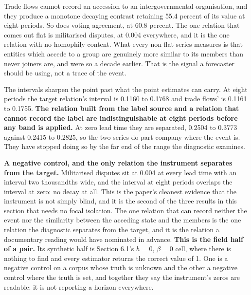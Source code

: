 \documentclass[twoside,11pt]{article}
\begin{document}
Trade flows cannot record an accession to an intergovernmental organisation, and they produce a monotone decaying contrast retaining 55.4 percent of its value at eight periods. So does voting agreement, at 60.8 percent. The one relation that comes out flat is militarised disputes, at 0.004 everywhere, and it is the one relation with no homophily content. What every non flat series measures is that entities which accede to a group are genuinely more similar to its members than never joiners are, and were so a decade earlier. That is the signal a forecaster should be using, not a trace of the event.

The intervals sharpen the point past what the point estimates can carry. At eight periods the target relation's interval is 0.1160 to 0.1768 and trade flows' is 0.1161 to 0.1755. \textbf{The relation built from the label source and a relation that cannot record the label are indistinguishable at eight periods before any band is applied.} At zero lead time they are separated, 0.2504 to 0.3773 against 0.2415 to 0.2825, so the two series do part company where the event is. They have stopped doing so by the far end of the range the diagnostic examines.

\textbf{A negative control, and the only relation the instrument separates from the target.} Militarised disputes sit at 0.004 at every lead time with an interval two thousandths wide, and the interval at eight periods overlaps the interval at zero: no decay at all. This is the paper's cleanest evidence that the instrument is not simply blind, and it is the second of the three results in this section that needs no focal isolation. The one relation that can record neither the event nor the similarity between the acceding state and the members is the one relation the diagnostic separates from the target, and it is the relation a documentary reading would have nominated in advance. \textbf{This is the field half of a pair.} Its synthetic half is Section 6.1's \(h = 0\), \(\beta = 0\) cell, where there is nothing to find and every estimator returns the correct value of 1. One is a negative control on a corpus whose truth is unknown and the other a negative control where the truth is set, and together they say the instrument's zeros are readable: it is not reporting a horizon everywhere.
\end{document}

